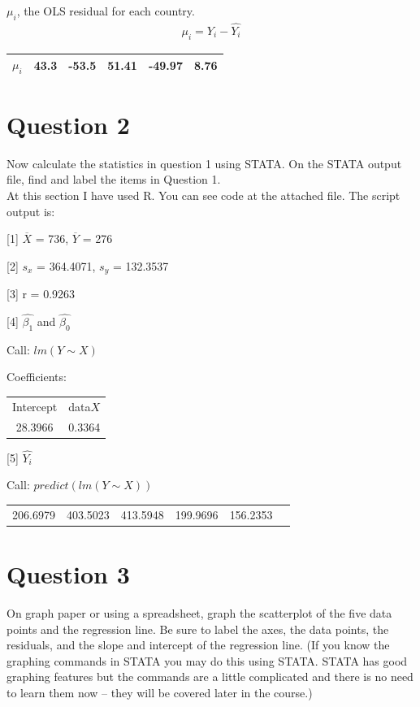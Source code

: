 \documentclass[12pt]{article}
\begin{document}
\begin{list}{)~}{}
\begin{center}
\begin{tabular}{|c|c|c|c|c|c|}
	\end{tabular}
\end{center}
\item  $\mu_i$, the OLS residual for each country. 
\begin{gather*}
\mu_i = Y_i - \hat{Y_i}
\end{gather*}
\begin{center}
	\begin{tabular}{|c|c|c|c|c|c|}
		\hline
		$\mu_i$ & 43.3 & -53.5 & 51.41 & -49.97 & 8.76\\
		\hline
	\end{tabular}
\end{center}
\end{list}

\section{Question 2}
Now calculate the statistics in question 1 using STATA. On the STATA output file, find and label the items in Question 1. \\
At this section I have used R. You can see code at the attached file.
The script output is:

[1] $\overline{X}$ = 736, $\overline{Y}$ = 276

[2] $s_x$ = 364.4071, $s_y$ = 132.3537

[3] r = 0.9263

[4] $\hat{\beta_1}$ and $\hat{\beta_0}$

Call: $lm(Y \sim X)$

Coefficients:

\begin{tabular}{cc}
	Intercept & data$X$\\
	28.3966 &  0.3364  
\end{tabular}

[5] $\hat{Y_i}$

Call: $predict(lm(Y \sim X))$

\begin{center}
	\begin{tabular}{|c|c|c|c|c|c|}
		206.6979 & 403.5023 & 413.5948 & 199.9696 & 156.2353\\
	\end{tabular}
\end{center}

\section{Question 3}
On graph paper or using a spreadsheet, graph the scatterplot of the five data points and the regression line. Be sure to label the axes, the data points, the residuals, and the slope and intercept of the regression line. (If you know the graphing commands in STATA you may do this using STATA. STATA has good graphing features but the commands are a little complicated and there is no need to learn them now – they will be covered later in the course.)
\end{document}
